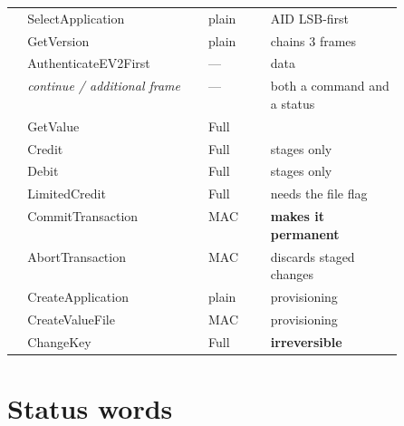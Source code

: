 \begin{center}\small
\begin{tabular}{@{}llL{0.16\linewidth}L{0.34\linewidth}@{}}
\toprule
{} &  &  &  \\
\midrule
{} & SelectApplication  & plain & AID LSB-first \\
 & GetVersion         & plain & chains 3 frames \\
 & AuthenticateEV2First & --- & data  \\
 & \emph{continue / additional frame} & --- & both a command and a status \\
 & GetValue           & Full  & \\
 & Credit             & Full  & stages only \\
 & Debit              & Full  & stages only \\
 & LimitedCredit      & Full  & needs the file flag \\
 & CommitTransaction  & MAC   & \textbf{makes it permanent} \\
 & AbortTransaction   & MAC   & discards staged changes \\
 & CreateApplication  & plain & provisioning \\
 & CreateValueFile    & MAC   & provisioning \\
 & ChangeKey          & Full  & \textbf{irreversible} \\
\bottomrule
\end{tabular}
\end{center}

\section{Status words}

